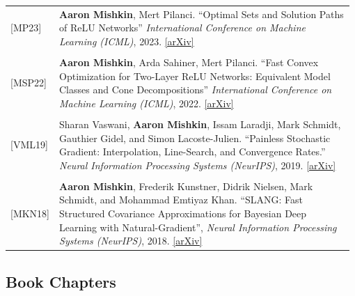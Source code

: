 \documentclass[10pt]{article}
\begin{document}
\begin{longtable}{C{0.1\linewidth} L{0.88\linewidth}}
    [MP23]       & \textbf{Aaron Mishkin}, Mert Pilanci. ``Optimal Sets and Solution Paths of
    ReLU Networks'' \textit{International Conference on Machine Learning
                        (ICML)}, 2023. \href{https://arxiv.org/abs/2306.00119}{[arXiv]}
    \\
                                                                                                                                                                            \\

    [MSP22]       & \textbf{Aaron Mishkin}, Arda Sahiner, Mert Pilanci. ``Fast Convex
    Optimization for Two-Layer ReLU Networks: Equivalent Model Classes and Cone
    Decompositions'' \textit{International Conference on Machine Learning
                         (ICML)}, 2022. \href{https://arxiv.org/abs/2202.01331}{[arXiv]}            \\
                                                                                                                                                                            \\

    [VML19] & Sharan Vaswani, \textbf{Aaron Mishkin}, Issam Laradji, Mark Schmidt,
    Gauthier Gidel, and Simon Lacoste-Julien.  ``Painless Stochastic Gradient:
    Interpolation, Line-Search, and Convergence Rates.'' \textit{Neural
                                                             Information Processing Systems (NeurIPS)}, 2019.
    \href{https://arxiv.org/abs/1905.09997}{[arXiv]}
    \\
                                                                                                                                                                            \\

    [MKN18]\!\! & \textbf{Aaron Mishkin}, Frederik Kunstner, Didrik Nielsen, Mark Schmidt,
    and Mohammad Emtiyaz Khan. ``SLANG: Fast Structured Covariance
    Approximations for Bayesian Deep Learning with Natural-Gradient'',
    \textit{Neural Information Processing Systems (NeurIPS)}, 2018.
    \href{https://arxiv.org/abs/1811.04504}{[arXiv]}
\end{longtable}

\subsection*{Book Chapters}
\end{document}
